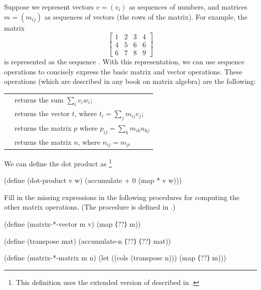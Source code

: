 \begin{exercise}
	\label{Exercise 2.37}
	Suppose we represent vectors \( v = (v_i) \) as sequences of numbers, and matrices \( m = (m_{ij}) \) as sequences of vectors (the rows of the matrix).
	For example, the matrix
	\[
	\begin{bmatrix}
		1 & 2 & 3 & 4 \\
		4 & 5 & 6 & 6 \\
		6 & 7 & 8 & 9
	\end{bmatrix}
	\]
	is represented as the sequence .
	With this representation, we can use sequence operations to concisely express the basic matrix and vector operations.
	These operations (which are described in any book on matrix algebra) are the following:
	\begin{center}
	\begin{tabular}{ll}
		\code{(dot-product v w)}
		&
		returns the sum $∑_i v_i w_i$;
		\\
		\code{(matrix-*-vector m v)}
		&
		returns the vector $t$, where $t_i = ∑_j m_{ij} v_j$;
		\\
		\code{(matrix-*-matrix m n)}
		&
		returns the matrix $p$ where $p_{ij} = ∑_k m_{ik} n_{kj}$
		\\
		\code{(transpose m)}
		&
		returns the matrix $n$, where $n_{ij} = m_{ji}$
	\end{tabular}
	\end{center}
	We can define the dot product as%
	\footnote{
		This definition uses the extended version of  described in .
	}
	\begin{scheme}
	  (define (dot-product v w)
	    (accumulate + 0 (map * v w)))
	\end{scheme}
	Fill in the missing expressions in the following procedures for computing the other matrix operations.
	(The procedure  is defined in .)
	\begin{scheme}
	  (define (matrix-*-vector m v)
	    (map ⟨??⟩ m))

	  (define (transpose mat)
	    (accumulate-n ⟨??⟩ ⟨??⟩ mat))

	  (define (matrix-*-matrix m n)
	    (let ((cols (transpose n)))
	      (map ⟨??⟩ m)))
	\end{scheme}
\end{exercise}



